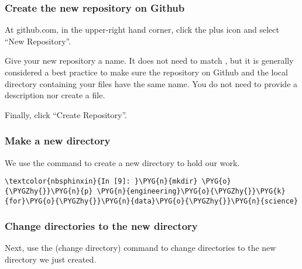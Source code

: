 \documentclass[letterpaper,10pt,english]{sphinxmanual}
\begin{document}
\subsubsection{Create the new repository on Github}
\label{\detokenize{02-elastic-compute-cloud:Create-the-new-repository-on-Github}}
At github.com, in the upper-right hand corner, click the plus icon and
select “New Repository”.

\begin{figure}[htbp]
\centering

\noindent{}
\end{figure}

Give your new repository a name. It does not need to match
, but it is generally considered a best
practice to make sure the repository on Github and the local directory
containing your files have the same name. You do not need to provide a
description nor create a  file.

Finally, click “Create Repository”.

\begin{figure}[htbp]
\centering

\noindent{}
\end{figure}


\subsubsection{Make a new directory}
\label{\detokenize{02-elastic-compute-cloud:Make-a-new-directory}}
We use the  command to create a new directory to hold our work.

%
\begin{Verbatim}[commandchars=\\\{\}]
\textcolor{nbsphinxin}{In [9]: }\PYG{n}{mkdir} \PYG{o}{\PYGZhy{}}\PYG{n}{p} \PYG{n}{engineering}\PYG{o}{\PYGZhy{}}\PYG{k}{for}\PYG{o}{\PYGZhy{}}\PYG{n}{data}\PYG{o}{\PYGZhy{}}\PYG{n}{science}
\end{Verbatim}


\subsubsection{Change directories to the new directory}
\label{\detokenize{02-elastic-compute-cloud:Change-directories-to-the-new-directory}}
Next, use the  (change directory) command to change directories to
the new directory we just created.
\end{document}
